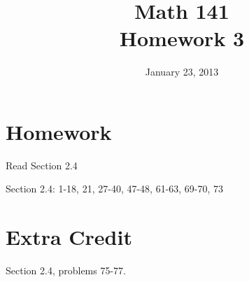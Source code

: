 \documentclass{exam}
\author{}
\date{January 23, 2013}
\title{Math 141 \\ Homework 3}
\begin{document}
\maketitle

\section{Homework}

\begin{itemize*}
  \item Read Section 2.4
  \item Section 2.4: 1-18, 21, 27-40, 47-48, 61-63, 69-70, 73
\end{itemize*}

\section{Extra Credit}
Section 2.4, problems 75-77.

\ifprintanswers
  \pagebreak
\end{document}
